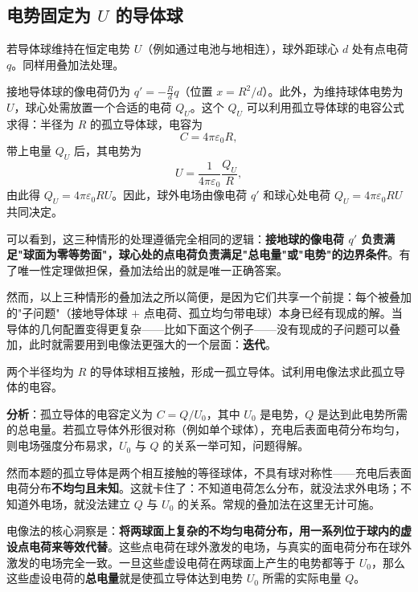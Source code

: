 \subsection{电势固定为 $U$ 的导体球}

若导体球维持在恒定电势 $U$（例如通过电池与地相连），球外距球心 $d$ 处有点电荷 $q$。同样用叠加法处理。

接地导体球的像电荷仍为 $q' = -\frac{R}{d}q$（位置 $x = R^2/d$）。此外，为维持球体电势为 $U$，球心处需放置一个合适的电荷 $Q_U$。这个 $Q_U$ 可以利用孤立导体球的电容公式求得：半径为 $R$ 的孤立导体球，电容为
\[
    C = 4\pi\varepsilon_0 R,
\]
带上电量 $Q_U$ 后，其电势为
\[
    U = \frac{1}{4\pi\varepsilon_0} \frac{Q_U}{R},
\]
由此得 $Q_U = 4\pi\varepsilon_0 R U$。因此，球外电场由像电荷 $q'$ 和球心处电荷 $Q_U = 4\pi\varepsilon_0 R U$ 共同决定。

可以看到，这三种情形的处理遵循完全相同的逻辑：\textbf{接地球的像电荷 $q'$ 负责满足"球面为零等势面"，球心处的点电荷负责满足"总电量"或"电势"的边界条件}。有了唯一性定理做担保，叠加法给出的就是唯一正确答案。

然而，以上三种情形的叠加法之所以简便，是因为它们共享一个前提：每个被叠加的"子问题"（接地导体球 $+$ 点电荷、孤立均匀带电球）本身已经有现成的解。当导体的几何配置变得更复杂——比如下面这个例子——没有现成的子问题可以叠加，此时就需要用到电像法更强大的一个层面：\textbf{迭代}。

\begin{ex}[两个接触导体球的电容]
    两个半径均为 $R$ 的导体球相互接触，形成一孤立导体。试利用电像法求此孤立导体的电容。
\end{ex}

\textbf{分析}：孤立导体的电容定义为 $C = Q/U_0$，其中 $U_0$ 是电势，$Q$ 是达到此电势所需的总电量。若孤立导体外形很对称（例如单个球体），充电后表面电荷分布均匀，则电场强度分布易求，$U_0$ 与 $Q$ 的关系一举可知，问题得解。

然而本题的孤立导体是两个相互接触的等径球体，不具有球对称性——充电后表面电荷分布\textbf{不均匀且未知}。这就卡住了：不知道电荷怎么分布，就没法求外电场；不知道外电场，就没法建立 $Q$ 与 $U_0$ 的关系。常规的叠加法在这里无计可施。

电像法的核心洞察是：\textbf{将两球面上复杂的不均匀电荷分布，用一系列位于球内的虚设点电荷来等效代替}。这些点电荷在球外激发的电场，与真实的面电荷分布在球外激发的电场完全一致。一旦这些虚设电荷在两球面上产生的电势都等于 $U_0$，那么这些虚设电荷的\textbf{总电量}就是使孤立导体达到电势 $U_0$ 所需的实际电量 $Q$。

